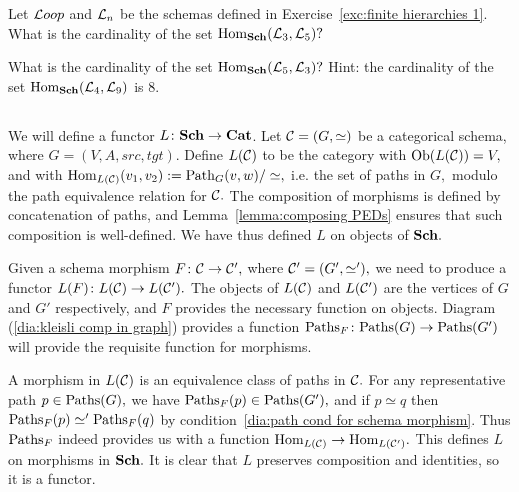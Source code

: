 \documentclass[CT4S-EN-RU]{subfiles}
\begin{document}
\begin{exerciseRUS}\label{exc:finite hierarchies 1}
\end{exerciseRUS}

\begin{exerciseENG}
Let ${\mathcal{L} oop}$ and $\mathcal{L}_n$ be the schemas defined in Exercise~\ref{exc:finite hierarchies 1}.
\sexc What is the cardinality of the set $\textnormal{Hom}_{\mathbf{Sch}}(\mathcal{L}_3,\mathcal{L}_5)?$
\item What is the cardinality of the set $\textnormal{Hom}_{\mathbf{Sch}}(\mathcal{L}_5,\mathcal{L}_3)?$ Hint: the cardinality of the set $\textnormal{Hom}_{\mathbf{Sch}}(\mathcal{L}_4,\mathcal{L}_9)$ is 8.
\endsexc
\end{exerciseENG}

\begin{exerciseRUS}
\end{exerciseRUS}


\subsection{}\label{sec:proof of cat=sch}

\begin{constructionENG}
We will define a functor $L\colon{\mathbf{Sch}}\rightarrow{\mathbf{Cat}}$. Let $\mathcal{C}=(G,\simeq)$ be a categorical schema, where $G=(V,A,src,tgt).$ Define $L(\mathcal{C})$ to be the category with $\textnormal{Ob}(L(\mathcal{C}))=V,$ and with $\textnormal{Hom}_{L(\mathcal{C})}(v_1,v_2):=\textnormal{Path}_G(v,w)/\simeq,$ i.e. the set of paths in $G,$ modulo the path equivalence relation for $\mathcal{C}.$ The composition of morphisms is defined by concatenation of paths, and Lemma~\ref{lemma:composing PEDs} ensures that such composition is well-defined. We have thus defined $L$ on objects of ${\mathbf{Sch}}.$

Given a schema morphism $F\colon\mathcal{C}\rightarrow\mathcal{C}',$ where $\mathcal{C}'=(G',\simeq'),$ we need to produce a functor $L(F)\colon L(\mathcal{C})\rightarrow L(\mathcal{C}').$ The objects of $L(\mathcal{C})$ and $L(\mathcal{C}')$ are the vertices of $G$ and $G'$ respectively, and $F$ provides the necessary function on objects. Diagram (\ref{dia:kleisli comp in graph}) provides a function $\textnormal{Paths}_F\colon\textnormal{Paths}(G)\rightarrow\textnormal{Paths}(G')$ will provide the requisite function for morphisms. 

A morphism in $L(\mathcal{C})$ is an equivalence class of paths in $\mathcal{C}.$ For any representative path $p\in\textnormal{Paths}(G),$ we have $\textnormal{Paths}_F(p)\in\textnormal{Paths}(G'),$ and if $p\simeq q$ then $\textnormal{Paths}_F(p)\simeq'\textnormal{Paths}_F(q)$ by condition~\ref{dia:path cond for schema morphism}. Thus $\textnormal{Paths}_F$ indeed provides us with a function $\textnormal{Hom}_{L(\mathcal{C})}\rightarrow\textnormal{Hom}_{L(\mathcal{C}')}.$ This defines $L$ on morphisms in ${\mathbf{Sch}}.$ It is clear that $L$ preserves composition and identities, so it is a functor.
\end{constructionENG}
\end{document}
